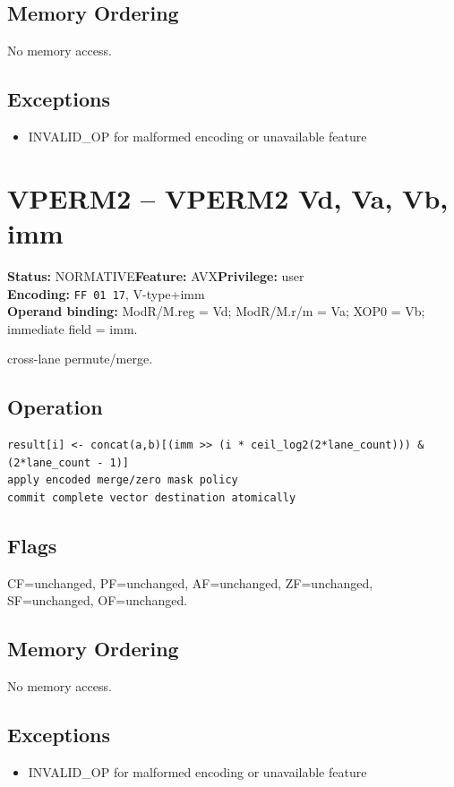 \documentclass[10pt]{article}
\begin{document}
\subsection*{Memory Ordering}
No memory access.
\subsection*{Exceptions}
\begin{itemize}
\item INVALID\_OP for malformed encoding or unavailable feature
\end{itemize}
\clearpage

\section{VPERM2 -- VPERM2 Vd, Va, Vb, imm}
\textbf{Status:} NORMATIVE\quad \textbf{Feature:} AVX\quad \textbf{Privilege:} user\\
\textbf{Encoding:} \texttt{FF 01 17}, V-type+imm\\
\textbf{Operand binding:} ModR/M.reg = Vd; ModR/M.r/m = Va; XOP0 = Vb; immediate field = imm.

cross-lane permute/merge.

\subsection*{Operation}
\begin{lstlisting}
result[i] <- concat(a,b)[(imm >> (i * ceil_log2(2*lane_count))) & (2*lane_count - 1)]
apply encoded merge/zero mask policy
commit complete vector destination atomically
\end{lstlisting}
\subsection*{Flags}
CF=unchanged, PF=unchanged, AF=unchanged, ZF=unchanged, SF=unchanged, OF=unchanged.
\subsection*{Memory Ordering}
No memory access.
\subsection*{Exceptions}
\begin{itemize}
\item INVALID\_OP for malformed encoding or unavailable feature
\end{itemize}
\clearpage
\end{document}
